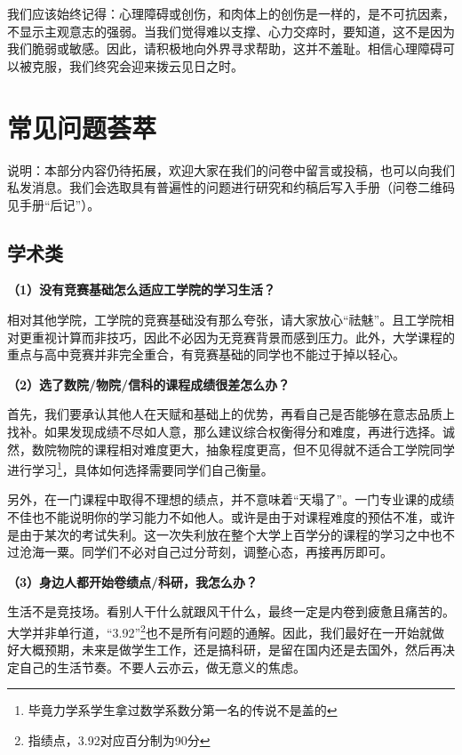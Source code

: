 \documentclass[11pt,oneside]{book}
\begin{document}
\vspace{10pt}

我们应该始终记得：心理障碍或创伤，和肉体上的创伤是一样的，是不可抗因素，不显示主观意志的强弱。当我们觉得难以支撑、心力交瘁时，要知道，这不是因为我们脆弱或敏感。因此，请积极地向外界寻求帮助，这并不羞耻。相信心理障碍可以被克服，我们终究会迎来拨云见日之时。

\section{常见问题荟萃}

说明：本部分内容仍待拓展，欢迎大家在我们的问卷中留言或投稿，也可以向我们私发消息。我们会选取具有普遍性的问题进行研究和约稿后写入手册（问卷二维码见手册“后记”）。

\subsection{学术类}
\textbf{（1）没有竞赛基础怎么适应工学院的学习生活？}

相对其他学院，工学院的竞赛基础没有那么夸张，请大家放心“祛魅”。且工学院相对更重视计算而非技巧，因此不必因为无竞赛背景而感到压力。此外，大学课程的重点与高中竞赛并非完全重合，有竞赛基础的同学也不能过于掉以轻心。

\vspace{10pt}

\textbf{（2）选了数院/物院/信科的课程成绩很差怎么办？}

首先，我们要承认其他人在天赋和基础上的优势，再看自己是否能够在意志品质上找补。如果发现成绩不尽如人意，那么建议综合权衡得分和难度，再进行选择。诚然，数院物院的课程相对难度更大，抽象程度更高，但不见得就不适合工学院同学进行学习\footnote{毕竟力学系学生拿过数学系数分第一名的传说不是盖的}，具体如何选择需要同学们自己衡量。

\vspace{10pt}

另外，在一门课程中取得不理想的绩点，并不意味着“天塌了”。一门专业课的成绩不佳也不能说明你的学习能力不如他人。或许是由于对课程难度的预估不准，或许是由于某次的考试失利。这一次失利放在整个大学上百学分的课程的学习之中也不过沧海一粟。同学们不必对自己过分苛刻，调整心态，再接再厉即可。

\vspace{10pt}

\textbf{（3）身边人都开始卷绩点/科研，我怎么办？}

生活不是竞技场。看别人干什么就跟风干什么，最终一定是内卷到疲惫且痛苦的。大学并非单行道，“3.92”\footnote{指绩点，3.92对应百分制为90分}也不是所有问题的通解。因此，我们最好在一开始就做好大概预期，未来是做学生工作，还是搞科研，是留在国内还是去国外，然后再决定自己的生活节奏。不要人云亦云，做无意义的焦虑。
\end{document}
